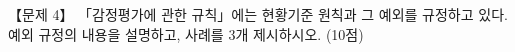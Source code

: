 \begin{longquestion}{【문제 4】}
「감정평가에 관한 규칙」에는 현황기준 원칙과 그 예외를 규정하고 있다. 예외 규정의 내용을 설명하고, 사례를 3개 제시하시오. (10점) \par
\end{longquestion}
